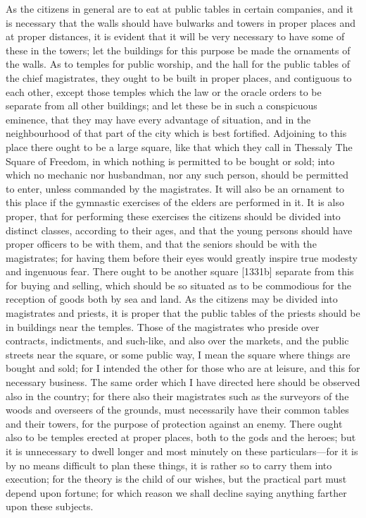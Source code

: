 As the citizens in general are to eat at public tables in certain
companies, and it is necessary that the walls should have bulwarks and
towers in proper places and at proper distances, it is evident that it
will be very necessary to have some of these in the towers; let the
buildings for this purpose be made the ornaments of the walls. As to
temples for public worship, and the hall for the public tables of the
chief magistrates, they ought to be built in proper places, and contiguous
to each other, except those temples which the law or the oracle orders to
be separate from all other buildings; and let these be in such a
conspicuous eminence, that they may have every advantage of situation, and
in the neighbourhood of that part of the city which is best fortified.
Adjoining to this place there ought to be a large square, like that which
they call in Thessaly The Square of Freedom, in which nothing is permitted
to be bought or sold; into which no mechanic nor husbandman, nor any such
person, should be permitted to enter, unless commanded by the magistrates.
It will also be an ornament to this place if the gymnastic exercises of
the elders are performed in it. It is also proper, that for performing
these exercises the citizens should be divided into distinct classes,
according to their ages, and that the young persons should have proper
officers to be with them, and that the seniors should be with the
magistrates; for having them before their eyes would greatly inspire true
modesty and ingenuous fear. There ought to be another square [1331b]
separate from this for buying and selling, which should be so situated as
to be commodious for the reception of goods both by sea and land. As the
citizens may be divided into magistrates and priests, it is proper that
the public tables of the priests should be in buildings near the temples.
Those of the magistrates who preside over contracts, indictments, and
such-like, and also over the markets, and the public streets near the
square, or some public way, I mean the square where things are bought and
sold; for I intended the other for those who are at leisure, and this for
necessary business. The same order which I have directed here should be
observed also in the country; for there also their magistrates such as the
surveyors of the woods and overseers of the grounds, must necessarily have
their common tables and their towers, for the purpose of protection
against an enemy. There ought also to be temples erected at proper places,
both to the gods and the heroes; but it is unnecessary to dwell longer and
most minutely on these particulars—for it is by no means difficult
to plan these things, it is rather so to carry them into execution; for
the theory is the child of our wishes, but the practical part must depend
upon fortune; for which reason we shall decline saying anything farther
upon these subjects.

